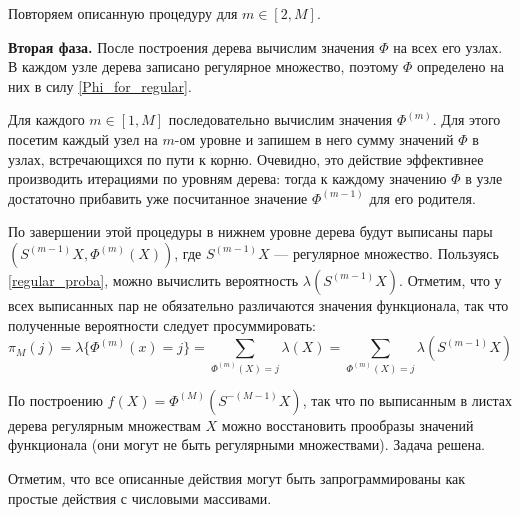 \documentclass[14pt, a4paper, russian]{report}
\begin{document}
Повторяем описанную процедуру для $m \in [2, M]$. 

\textbf{Вторая фаза. } После построения дерева вычислим значения $\Phi$ на всех его узлах. В каждом узле дерева записано регулярное множество, поэтому $\Phi$ определено на них в силу \cref{Phi_for_regular}. 

Для каждого $m \in [1, M]$ последовательно вычислим значения $\Phi^{(m)}$. Для этого посетим каждый узел на $m$-ом уровне и запишем в него сумму значений $\Phi$ в узлах, встречающихся по пути к корню. Очевидно, это действие эффективнее производить итерациями по уровням дерева: тогда к каждому значению $\Phi$ в узле достаточно прибавить уже посчитанное значение $\Phi^{(m-1)}$ для его родителя.

По завершении этой процедуры в нижнем уровне дерева будут выписаны пары $\left(S^{(m-1)}X, \Phi^{(m)}(X)\right)$, где $S^{(m-1)}X$ --- регулярное множество. Пользуясь \cref{regular_proba}, можно вычислить вероятность $\lambda(S^{(m-1)}X)$. Отметим, что у всех выписанных пар не обязательно различаются значения функционала, так что полученные вероятности следует просуммировать:
 $$\pi_M(j) = \lambda\{\Phi^{(m)}(x) = j\} = \sum\limits_{\Phi^{(m)}(X)=j} \lambda(X) = \sum\limits_{\Phi^{(m)}(X)=j} \lambda(S^{(m-1)}X)$$
 
 По построению $f(X) = \Phi^{(M)}(S^{-(M-1)}X)$, так что по выписанным в листах дерева регулярным множествам $X$ можно восстановить прообразы значений функционала (они могут не быть регулярными множествами). Задача решена.
 
 Отметим, что все описанные действия могут быть запрограммированы как простые действия с числовыми массивами.
\end{document}
